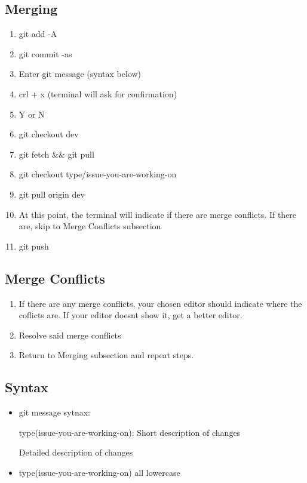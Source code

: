 \documentclass{article}
\begin{document}
		\subsection{Merging}
			\begin{enumerate}
				\item git add -A
				\item git commit -as
				\item Enter git message (syntax below)
				\item crl + x (terminal will ask for confirmation)
				\item Y or N
				\item git checkout dev
				\item git fetch \&\& git pull
				\item git checkout type/issue-you-are-working-on
				\item git pull origin dev
				\item At this point, the terminal will indicate if there are merge conflicts. If there are, skip to Merge Conflicts subsection
				\item git push
			\end{enumerate}
		\subsection{Merge Conflicts}
			\begin{enumerate}
				\item If there are any merge conflicts, your chosen editor should indicate where the coflicts are. If your editor doesnt show it, get a better editor.
				\item Resolve said merge conflicts
				\item Return to Merging subsection and repeat steps.
			\end{enumerate}
		\subsection{Syntax}
			\begin{itemize}
				\item git message sytnax:
				 
				type(issue-you-are-working-on): Short description of changes
				
				Detailed description of changes
				\item type(issue-you-are-working-on) all lowercase
			\end{itemize}
\end{document}
